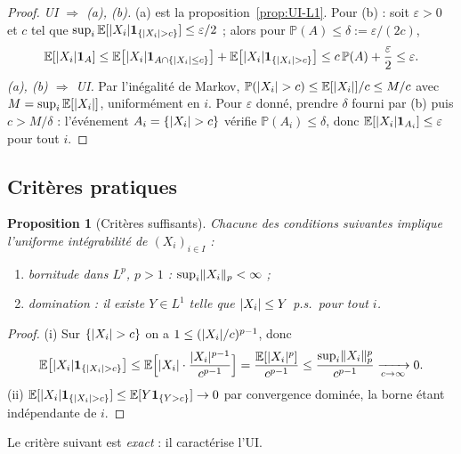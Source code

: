 \documentclass[11pt,a4paper]{article}
\theoremstyle{plain}
\newtheorem{proposition}[theorem]{Proposition}
\theoremstyle{definition}
\theoremstyle{remark}
\newcommand{\E}{\mathbb{E}}
\newcommand{\Prob}{\mathbb{P}}
\newcommand{\ind}{\mathbf{1}}
\DeclarePairedDelimiter{\abs}{\lvert}{\rvert}
\DeclarePairedDelimiter{\norm}{\lVert}{\rVert}
\begin{document}
\begin{proof}
\emph{UI $\Rightarrow$ (a), (b).} (a) est la proposition~\ref{prop:UI-L1}. Pour
(b) : soit $\varepsilon > 0$ et $c$ tel que
$\sup_i \E[\abs{X_i}\ind_{\{\abs{X_i}>c\}}] \le \varepsilon/2$ ; alors pour
$\Prob(A) \le \delta := \varepsilon/(2c)$,
\[
\E[\abs{X_i}\ind_A]
\le \E\bigl[\abs{X_i}\ind_{A \cap \{\abs{X_i}\le c\}}\bigr]
+ \E\bigl[\abs{X_i}\ind_{\{\abs{X_i}>c\}}\bigr]
\le c\,\Prob(A) + \frac{\varepsilon}{2} \le \varepsilon.
\]
\emph{(a), (b) $\Rightarrow$ UI.} Par l'inégalité de Markov,
$\Prob(\abs{X_i} > c) \le \E[\abs{X_i}]/c \le M/c$ avec
$M = \sup_i \E[\abs{X_i}]$, uniformément en $i$. Pour $\varepsilon$ donné,
prendre $\delta$ fourni par (b) puis $c > M/\delta$ : l'événement
$A_i = \{\abs{X_i} > c\}$ vérifie $\Prob(A_i) \le \delta$, donc
$\E[\abs{X_i}\ind_{A_i}] \le \varepsilon$ pour tout $i$.
\end{proof}

\subsection{Critères pratiques}

\begin{proposition}[Critères suffisants]\label{prop:criteres}
Chacune des conditions suivantes implique l'uniforme intégrabilité de
$(X_i)_{i\in I}$ :
\begin{enumerate}[label=(\roman*)]
\item \emph{bornitude dans $L^p$, $p > 1$} :
      $\sup_i \norm{X_i}_p < \infty$ ;
\item \emph{domination} : il existe $Y \in L^1$ telle que $\abs{X_i} \le Y$
      p.s.\ pour tout $i$.
\end{enumerate}
\end{proposition}

\begin{proof}
(i) Sur $\{\abs{X_i} > c\}$ on a $1 \le (\abs{X_i}/c)^{p-1}$, donc
\[
\E\bigl[\abs{X_i}\ind_{\{\abs{X_i}>c\}}\bigr]
\le \E\Bigl[\abs{X_i}\cdot \frac{\abs{X_i}^{p-1}}{c^{p-1}}\Bigr]
= \frac{\E[\abs{X_i}^p]}{c^{p-1}}
\le \frac{\sup_i \norm{X_i}_p^p}{c^{p-1}}
\xrightarrow[c\to\infty]{} 0.
\]
(ii) $\E[\abs{X_i}\ind_{\{\abs{X_i}>c\}}] \le \E[Y \ind_{\{Y>c\}}] \to 0$ par
convergence dominée, la borne étant indépendante de $i$.
\end{proof}

Le critère suivant est \emph{exact} : il caractérise l'UI.
\end{document}
